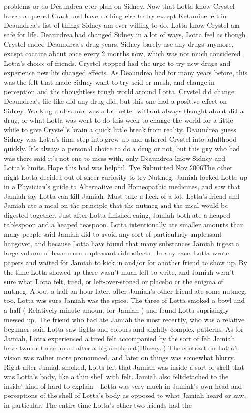 \documentclass[12pt]{book}
\begin{document}
problems or do Deaundrea ever plan on Sidney. Now that Lotta know Crystel have conquered Crack and have nothing else to try except Ketamine left in Deaundrea's list of things Sidney am ever willing to do, Lotta know Crystel am safe for life. Deaundrea had changed Sidney in a lot of ways, Lotta feel as though Crystel ended Deaundrea's drug years, Sidney barely use any drugs anymore, except cocaine about once every 2 months now, which was not much considered Lotta's choice of friends. Crystel stopped had the urge to try new drugs and experience new life changed effects. As Deaundrea had for many years before, this was the felt that made Sidney want to try acid or mush, and change in perception and the thoughtless tough world around Lotta. Crystel did change Deaundrea's life like did any drug did, but this one had a positive effect on Sidney. Working and school was a lot better without always thought about did a drug, or what Lotta was went to do this week to change the world for a little while to give Crystel's brain a quick little break from reality. Deaundrea guess Sidney was Lotta's final step into grew up and ushered Crystel into adulthood quickly. It's always a personal choice to do a drug or not, but this guy who had was there said it's not one to mess with, only Deaundrea know Sidney and Lotta's limits. Hope this had was helpful. Tye Submitted Nov 2006The other night Lotta decided out of sheer curiosity to try Nutmeg. Jamiah looked Lotta up in a Physician's guide to Alternative and Homeopathic medicines, and saw that Jamiah say Lotta can kill Jamiah. Must take a heck of a lot. Lotta's friend and Jamiah ate a meal on the principle that the nutmeg and the meal would be digested together. Just after Lotta finished eaing, Jamiah both ate a heaped tablespoon and a heaped teaspoon. Lotta intentionally ate smaller amounts than many people said Jamiah did to avoid any sort of particularly unpleasant hangover, and because Lotta have found that many substances Jamiah ingest a large volume of have more unpleasant side affects.. In any case, Lotta wrote papers and waited for Jamiah to kick in and/or for another friend to show up. By the time Lotta showed up there wasn't much left to write, and Jamiah wern't sure what Lotta felt, tired, or left-over-stoned or placebo or the enigma of nutmeg. About a half an hour later, after Jamiah's other friend ate some nutmeg, too, Lotta was sure Jamiah was the spice. The three of Lotta smoked a bowl and a half ( Relatively minute amount for Jamiah ) and found Lotta suprisingly messed up. The friend who had ate Jamiah the most recently, who was a relative beginner, said Lotta saw lights and colours and slightly complex patterns. As for Jamiah, Lotta experienced a tired felt accompanied by the sort of felt Jamiah have two or three hours after a big smokeout(Bluzzy. ) The contrast on Lotta's vision was rather more pronounced, and later on things was somewhat blurry. Right after Jamiah smoked, Lotta felt that Jamiah was inside a sort of shell that was Lotta's body, like a thin shell with felt. Jamiah also feltdetached to the inside' kind of hard to explain - Lotta was very much in Jamiah's own head and perceptions of the shell of Lotta's body as opposed to what Jamiah heard or saw, in particular. The entire time Lotta's other two friends had the 
\end{document}
